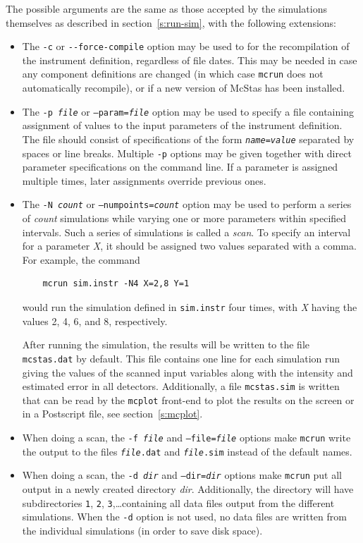 The possible arguments are the same as those accepted by the simulations
themselves as described in section~\ref{s:run-sim}, with the following
extensions:
\begin{itemize}
\item The \verb+-c+ or \verb+--force-compile+ option may be used to for
  the recompilation of the instrument definition, regardless of file
  dates. This may be needed in case any component definitions are
  changed (in which case \verb+mcrun+ does not automatically recompile),
  or if a new version of McStas has been installed.
\item The \texttt{-p {\it file}} or \texttt{--param={\it file}} option
  may be used to specify a file containing assignment of values to the
  input parameters of the instrument definition. The file should consist
  of specifications of the form \texttt{{\it name\/}={\it value\/}}
  separated by spaces or line breaks. Multiple \verb+-p+ options may be
  given together with direct parameter specifications on the command
  line. If a parameter is assigned multiple times, later assignments
  override previous ones.
\item The \texttt{-N {\it count}} or \texttt{--numpoints={\it count}} option
  may be used to perform a series of \textit{count\/} simulations while
  varying one or more parameters within specified intervals. Such a
  series of simulations is called a \emph{scan}. To specify
  an interval for a parameter \textit{X}, it should be assigned two
  values separated with a comma. For example, the command
\begin{verbatim}
    mcrun sim.instr -N4 X=2,8 Y=1
\end{verbatim}
would run the simulation defined in \verb+sim.instr+ four times, with
\textit{X} having the values 2, 4, 6, and 8, respectively.

After running the simulation, the results will be written to the file
\verb+mcstas.dat+ by default. This file contains one line for each
simulation run giving the values of the scanned input variables along
with the intensity and estimated error in all detectors. Additionally, a
file \verb+mcstas.sim+ is written that can be read by the \verb+mcplot+
front-end to plot the results on the screen or in a Postscript file, see
section~\ref{s:mcplot}.
\item When doing a scan, the \texttt{-f {\it file}} and
  \texttt{--file={\it file}} options make \verb+mcrun+ write the output
  to the files \texttt{{\it file\/}.dat} and \texttt{{\it file\/}.sim}
  instead of the default names.
\item When doing a scan, the \texttt{-d {\it dir}} and
  \texttt{--dir={\it dir}} options make \verb+mcrun+ put all output in a
  newly created directory \textit{dir}. Additionally, the directory will
  have subdirectories \verb+1+, \verb+2+, \verb+3+,\ldots containing all
  data files output from the different simulations. When the \verb+-d+
  option is not used, no data files are written from the individual
  simulations (in order to save disk space).
\end{itemize}

